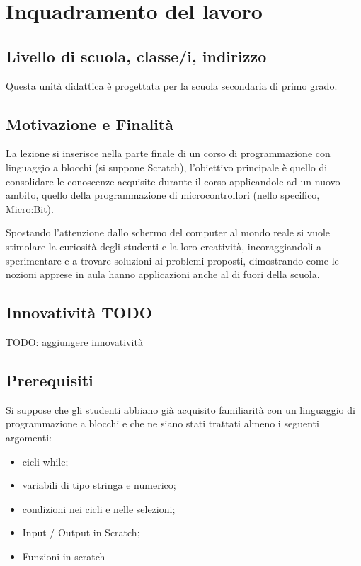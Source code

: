 \documentclass[../../relazione.tex]{subfiles}
\begin{document}
\section{Inquadramento del lavoro}

\subsection{Livello di scuola, classe/i, indirizzo}
Questa unità didattica è progettata per la scuola secondaria di primo grado.

\subsection{Motivazione e Finalità}
La lezione si inserisce nella parte finale di un corso di programmazione con linguaggio a blocchi (si suppone Scratch), l'obiettivo principale è quello di consolidare le conoscenze acquisite durante il corso applicandole ad un nuovo ambito, quello della programmazione di microcontrollori (nello specifico, Micro:Bit).

Spostando l'attenzione dallo schermo del computer al mondo reale si vuole stimolare la curiosità degli studenti e la loro creatività, incoraggiandoli a sperimentare e a trovare soluzioni ai problemi proposti, dimostrando come le nozioni apprese in aula hanno applicazioni anche al di fuori della scuola.

\subsection{Innovatività TODO}
TODO: aggiungere innovatività

\subsection{Prerequisiti}
Si suppose che gli studenti abbiano già acquisito familiarità con un linguaggio di programmazione a blocchi e che ne siano stati trattati almeno i seguenti argomenti:
\begin{itemize}
	\item cicli while;
	\item variabili di tipo stringa e numerico;
	\item condizioni nei cicli e nelle selezioni;
	\item Input / Output in Scratch;
	\item Funzioni in scratch
\end{itemize}
\end{document}
